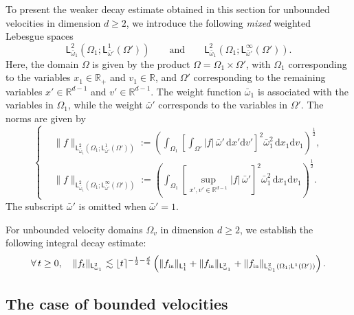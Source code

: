\documentclass[11pt]{amsart}
\theoremstyle{definition}
\theoremstyle{remark}
\numberwithin{equation}{section}
\newcommand\R{{\mathbb R}}
\newcommand{\init}{\text{{\tiny {\rm in}}}}
\newcommand{\sfL}{\mathsf{L}}
\newcommand{\wangle}[1]{\lfloor #1 \rceil}
\begin{document}
To present the weaker decay estimate obtained in this section for unbounded velocities in dimension $d \geq 2$, we introduce the following \emph{mixed} weighted Lebesgue spaces
\begin{equation*}
  \sfL^2_{\bar\omega_1}(\Omega_1; \sfL^{1}_{\bar \omega'}(\Omega')) \qquad \text{and} \qquad \sfL^2_{\bar\omega_1}(\Omega_1; \sfL^\infty_{\bar \omega'}(\Omega')).
\end{equation*}
Here, the domain $\Omega$ is given by the product $\Omega = \Omega_1 \times \Omega'$, with $\Omega_1$ corresponding to the variables $x_1 \in \R_+$ and $v_1 \in \R$, and $\Omega'$ corresponding to the remaining variables $x' \in \R^{d-1}$ and $v' \in \R^{d-1}$. The weight function $\bar\omega_1$ is associated with the variables in $\Omega_1$, while the weight $\bar\omega'$ corresponds to the variables in $\Omega'$. The norms are given by
\begin{equation}
  \label{eq:mixed-space}
  \begin{cases}
    & \displaystyle
    \|f\|_{\sfL^2_{\bar\omega_1}(\Omega_1; \sfL^{1}_{\bar\omega'}(\Omega'))} := \left( \int_{\Omega_1} \left[ \int_{\Omega'} |f| \, \bar\omega' \, \mathrm{d}x' \mathrm{d}v' \right]^2 \bar\omega_1^2 \, \mathrm{d}x_1 \mathrm{d}v_1 \right)^{\frac{1}{2}}, \\[3mm]
    & \displaystyle
    \|f\|_{\sfL^2_{\bar\omega_1}(\Omega_1; \sfL^\infty_{\bar\omega'}(\Omega'))} := \left( \int_{\Omega_1} \left[ \sup_{x',v' \in \R^{d-1}} |f| \, \bar\omega' \right]^2 \bar\omega_1^2 \, \mathrm{d}x_1 \mathrm{d}v_1 \right)^{\frac{1}{2}}.
  \end{cases}
\end{equation}
The subscript $\bar\omega'$ is omitted when $\bar\omega' = 1$.

For unbounded velocity domains $\Omega_v$ in dimension $d \geq 2$, we establish the following integral decay estimate:
\begin{equation}
  \label{eq:decay-int-add}
  \forall\, t \geq 0, \quad \|f_t\|_{\sfL^{2}_{\omega_1}} \lesssim \wangle{t}^{-\frac{1}{2}-\frac{d}{4}} \left( \|f_{\init}\|_{\sfL^{1}_{1}} + \|f_{\init}\|_{\sfL^{2}_{\omega_1}} + \|f_{\init}\|_{\sfL^{2}_{\bar\omega_1}(\Omega_1; \sfL^{1}(\Omega'))} \right).
\end{equation}

\subsection{The case of bounded velocities} \label{subsec:Moment-bddvelocities}
\end{document}
